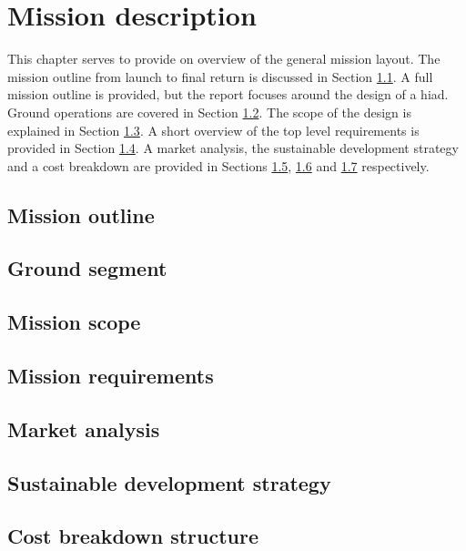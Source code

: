 \section{Mission description}\label{cha:missiondescr}

This chapter serves to provide on overview of the general mission layout. The mission outline from launch to final return is discussed in Section \ref{sec:missionoutline}. A full mission outline is provided, but the report focuses around the design of a \gls{hiad}. Ground operations are covered in Section \ref{sec:gop}. The scope of the design is explained in Section \ref{sec:missionscope}. A short overview of the top level requirements is provided in Section \ref{sec:missionreq}. A market analysis, the sustainable development strategy and a cost breakdown are provided in Sections \ref{sec:marketanalysis}, \ref{sec:sustainable} and \ref{sec:costbreakdown} respectively. 

\subsection{Mission outline} \label{sec:missionoutline}


\subsection{Ground segment} \label{sec:gop}


\subsection{Mission scope} \label{sec:missionscope}


\subsection{Mission requirements} \label{sec:missionreq}


\subsection{Market analysis} \label{sec:marketanalysis}


\subsection{Sustainable development strategy} \label{sec:sustainable}


\subsection{Cost breakdown structure} \label{sec:costbreakdown}


%

